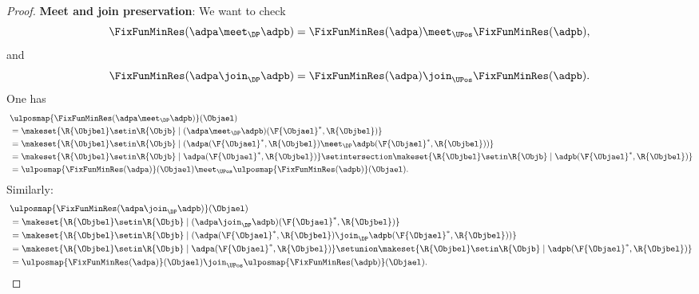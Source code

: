 \begin{proof}
    \textbf{Meet and join preservation}:
    We want to check
    \begin{equation*}
        \FixFunMinRes(\adpa \meet_\DP \adpb)=\FixFunMinRes(\adpa) \meet_\UPos \FixFunMinRes(\adpb),
    \end{equation*}
    and
    \begin{equation*}
        \FixFunMinRes(\adpa \join_\DP \adpb)=\FixFunMinRes(\adpa) \join_\UPos \FixFunMinRes(\adpb).
    \end{equation*}
    One has
    \begin{equation*}
        \begin{aligned}
            ~ &
            \ulposmap{\FixFunMinRes(\adpa \meet_\DP \adpb)}(\Objael) \\
              & =\makeset{ \R{\Objbel} \setin \R{\Objb} \mid (\adpa \meet_\DP \adpb)(\F{\Objael}^*,\R{\Objbel})} \\
              & =\makeset{ \R{\Objbel} \setin \R{\Objb} \mid (\adpa(\F{\Objael}^*,\R{\Objbel})\meet_\DP \adpb(\F{\Objael}^*,\R{\Objbel}))} \\
              & =\makeset{ \R{\Objbel} \setin \R{\Objb} \mid \adpa(\F{\Objael}^*,\R{\Objbel})} \setintersection \makeset{ \R{\Objbel} \setin \R{\Objb} \mid  \adpb(\F{\Objael}^*,\R{\Objbel})} \\
              & =\ulposmap{\FixFunMinRes(\adpa)}(\Objael) \meet_\UPos \ulposmap{\FixFunMinRes(\adpb)}(\Objael).
        \end{aligned}
    \end{equation*}
    Similarly:
    \begin{equation*}
        \begin{aligned}
            ~ & \ulposmap{\FixFunMinRes(\adpa \join_\DP \adpb)}(\Objael) \\
              & =\makeset{ \R{\Objbel} \setin \R{\Objb} \mid (\adpa \join_\DP \adpb)(\F{\Objael}^*,\R{\Objbel})} \\
              & =\makeset{ \R{\Objbel} \setin \R{\Objb} \mid (\adpa(\F{\Objael}^*,\R{\Objbel})\join_\DP \adpb(\F{\Objael}^*,\R{\Objbel}))} \\
              & =\makeset{ \R{\Objbel} \setin \R{\Objb} \mid \adpa(\F{\Objael}^*,\R{\Objbel})} \setunion \makeset{ \R{\Objbel} \setin \R{\Objb} \mid  \adpb(\F{\Objael}^*,\R{\Objbel})} \\
              & =\ulposmap{\FixFunMinRes(\adpa)}(\Objael) \join_\UPos \ulposmap{\FixFunMinRes(\adpb)}(\Objael).
        \end{aligned}
    \end{equation*}


\end{proof}
